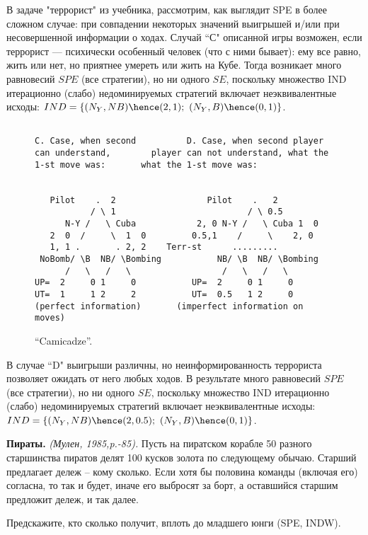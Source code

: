 \documentclass[a4paper,12pt]{article}
\begin{document}
\begin{exmp}{\rm В задаче "террорист" из учебника,
рассмотрим, как выглядит SPE в более сложном случае: при
совпадении некоторых значений выигрышей и/или при
несовершенной информации о ходах. Случай ``С" описанной
игры возможен, если террорист --- психически особенный
человек (что с ними бывает): ему все равно, жить или нет,
но приятнее умереть или жить на Кубе. Тогда возникает много
равновесий $SPE$ (все стратегии), но ни одного $SE$,
поскольку множество IND итерационно (слабо) недоминируемых
стратегий включает неэквивалентные исходы: $IND=\{
(N_Y,NB)\hence (2,1);~ (N_Y,B)\hence (0,1)\}$.

\begin{figure}[h]
\begin{verbatim}

C. Case, when second          D. Case, when second player
can understand,        player can not understand, what the
1-st move was:       what the 1-st move was:


   Pilot    .  2                  Pilot    .   2
           / \ 1                          / \ 0.5
      N-Y /   \ Cuba            2, 0 N-Y /   \ Cuba 1  0
   2  0  /     \  1  0         0.5,1    /     \    2, 0
   1, 1 .       . 2, 2    Terr-st      .........
 NoBomb/ \B  NB/ \Bombing           NB/ \B  NB/ \Bombing
      /   \   /   \                  /   \   /   \
UP=  2     0 1     0           UP=  2     0 1     0
UT=  1     1 2     2           UT=  0.5   1 2     0
(perfect information)       (imperfect information on moves)
\end{verbatim}\caption{``Camicadze''.}
\end{figure}

В случае ``D" выигрыши различны, но неинформированность
террориста позволяет ожидать от него любых ходов. В
результате много равновесий $SPE$ (все стратегии), но ни
одного $SE$, поскольку множество IND итерационно (слабо)
недоминируемых стратегий включает неэквивалентные исходы:
$IND=\{ (N_Y,NB)\hence (2,0.5);~ (N_Y,B)\hence (0,1)\}$.
}\end{exmp}

\begin{exmp}\rm
{\bf Пираты.} {\em (Мулен, 1985,p.-85).} Пусть на пиратском
корабле 50 разного старшинства пиратов делят 100 кусков
золота по следующему обычаю. Старший предлагает дележ --
кому сколько. Если хотя бы половина команды (включая его)
согласна, то так и будет, иначе его выбросят за борт, а
оставшийся старшим предложит дележ, и так далее.

Предскажите, кто сколько получит, вплоть до младшего юнги
(SPE, INDW).
\end{exmp}
\end{document}
